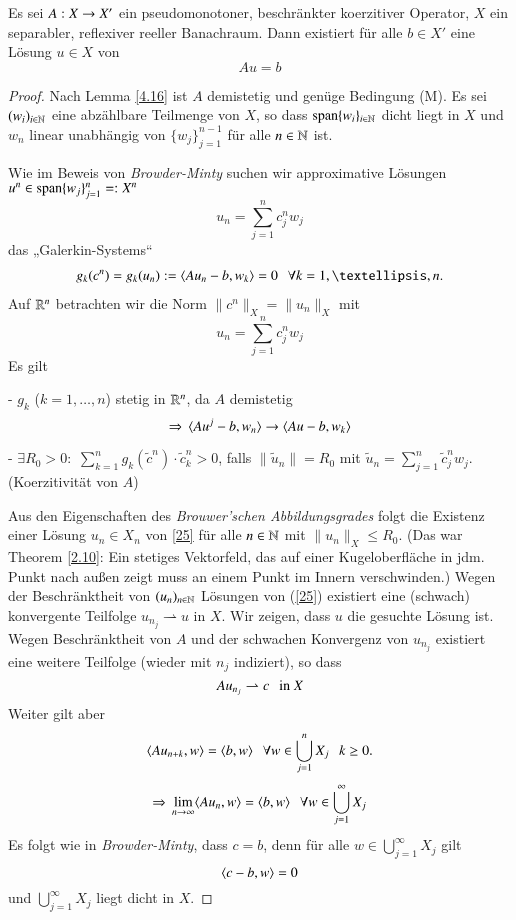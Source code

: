 \begin{theorem}[Brezis]\label{4.16}
    Es sei $A:X\rightarrow X'$ ein pseudomonotoner, beschränkter koerzitiver Operator,
    $X$ ein separabler, reflexiver reeller Banachraum. Dann existiert für alle $b\in X'$
    eine Lösung $u\in X$ von
    \[
        Au=b
    \]
\end{theorem}

\begin{proof}
    Nach Lemma \ref{4.16} ist $A$ demistetig und genüge Bedingung (M). Es sei $(w_i)_{i\in \mathbb{N}}$
    eine abzählbare Teilmenge von $X$, so dass $\mathrm{span}\{w_i\}_{i\in \mathbb{N}}$ dicht liegt in $X$ und
    $w_n$ linear unabhängig von $\{w_j\}_{j=1}^{n-1}$ für alle $n\in\mathbb{N}$ ist.

    Wie im Beweis von \textit{Browder-Minty} suchen wir approximative Lösungen $u^n\in \mathrm{span}\{w_j\}
    _{j=1}^n=:X^n$
    \[
        u_n=\sum_{j=1}^n c_j^nw_j
    \]
    das „Galerkin-Systems“
    \begin{align}\label{25}
        g_k(c^n)=g_k(u_n):=\lal Au_n - b, w_k\ral =0\qq \forall k=1,…,n.
    \end{align}
    Auf $\mathbb{R}^n$ betrachten wir die Norm $\|c^n\|_X=\|u_n\|_X$ mit
    \[
        u_n=\sum_{j=1}^nc_j^nw_j
    \]
    Es gilt
    \begin{description}
    \item{-} $g_k$ ($k=1,…,n$) stetig in $\mathbb{R}^n$, da $A$ demistetig
    \[
        \Rightarrow \, \langle Au^j-b,w_n\rangle\rightarrow \langle Au -b,w_k\rangle
    \]
    \item{-} $\exists R_0>0:$ $\sum_{k=1}^n g_k(\tilde c^n)\cdot \tilde c_k^n>0$,
    falls $\|\tilde u_n\|=R_0$ mit $\tilde u_n=\sum_{j=1}^n\tilde c_j^nw_j$. (Koerzitivität von $A$) 
    \end{description}
    Aus den Eigenschaften des \textit{Brouwer'schen Abbildungsgrades} folgt die Existenz einer Lösung
    $u_n\in X_n$ von \ref{25} für alle $n\in \mathbb{N}$ mit $\|u_n\|_X\leq R_0$.
    (Das war Theorem \ref{2.10}: Ein stetiges Vektorfeld, das auf einer Kugeloberfläche in jdm. Punkt
     nach außen zeigt muss an einem Punkt im Innern verschwinden.)
    Wegen der Beschränktheit von $(u_n)_{n\in\mathbb{N}}$ Lösungen von (\ref{25}) existiert eine (schwach)
    konvergente Teilfolge $u_{n_j}\rightharpoonup u$ in $X$. Wir zeigen, dass $u$ die gesuchte Lösung
    ist. Wegen Beschränktheit von $A$ und der schwachen Konvergenz von $u_{n_j}$ existiert eine weitere
    Teilfolge (wieder mit $n_j$ indiziert), so dass
    \[
        Au_{n_j}\rightharpoonup c \hspace{.25cm} \text{in }X
    \]
    Weiter gilt aber
    \[
        \langle Au_{n+k}, w \rangle = \langle b,w \rangle \hspace{.25cm} \forall w\in \bigcup_{j=1}^n X_j \hspace{.25cm} k\geq 0.
    \]
    \begin{align*}
        \Rightarrow \, \lim_{n\rightarrow \infty} \langle Au_n, w\rangle = \langle b,w\rangle \hspace{.25cm} \forall w\in \bigcup_{j=1}^\infty
        X_j
    \end{align*}
    Es folgt wie in \textit{Browder-Minty}, dass $c=b$, denn für alle $w\in \bigcup_{j=1}^\infty X_j$
    gilt
    \[
        \langle c-b , w\rangle =0
    \]
    und $\bigcup_{j=1}^\infty X_j$ liegt dicht in $X$.


\end{proof}
